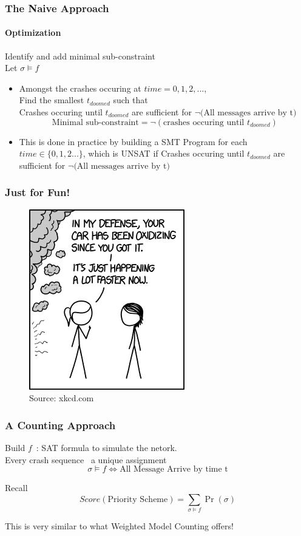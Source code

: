 \documentclass{beamer}
\begin{document}
\begin{frame}
\frametitle{The Naive Approach}
\framesubtitle{Optimization} 
	Identify and add minimal sub-constraint\\[2ex]
	Let $ \sigma \vDash f$\\
	\begin{itemize}
	\item Amongst the crashes occuring at $time=0,1,2,...$,\\
	Find the smallest $t_{doomed}$ such that\\
	Crashes occuring until $t_{doomed}$ are sufficient for $\neg\text{(All messages arrive by t)}$\\
	$$\text{Minimal sub-constraint} = \neg(\text{crashes occuring until }t_{doomed})$$
	\item This is done in practice by building a SMT Program for each $time\in\{0,1,2...\}$, which is UNSAT if Crashes occuring until $t_{doomed}$ are sufficient for $\neg\text{(All messages arrive by t)}$
	\end{itemize}
\end{frame}

\begin{frame}
\frametitle{Just for Fun!}
	\begin{figure}
	\includegraphics[scale=0.7]{media/xkcd1.png}
	\caption{\tiny Source: xkcd.com}
	\end{figure}
\end{frame}

\begin{frame}
\frametitle{A Counting Approach}
	Build $ f $\ : SAT formula to simulate the netork.\\
	Every crash sequence \mapsto\ a unique assignment \sigma\  
	$$\sigma \vDash f \iff \text{All Message Arrive by time t}$$
	\vspace*{-15pt}
	\begin{block}{Recall}
	$$ Score(\text{Priority Scheme}) = \sum_{\sigma \vDash f}\Pr(\sigma) $$
	\end{block}
	\pause
	This is very similar to what Weighted Model Counting offers!
\end{frame}
\end{document}
